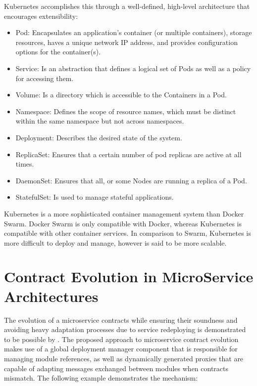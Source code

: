 Kubernetes accomplishes this through a well-defined, high-level architecture that encourages extensibility:

\begin{itemize}
    \item Pod: Encapsulates an application's container (or multiple containers),
    storage resources, haves a unique network IP address, and provides configuration options for the container(s).
    \item Service: Is an abstraction that defines a logical set of Pods as well as a policy for accessing them.
    \item Volume: Is a directory which is accessible to the
    Containers in a Pod.
    \item Namespace: Defines the scope of resource names, which must be distinct within the same namespace but not across namespaces.
    \item Deployment: Describes the desired state of the system.
    \item ReplicaSet: Ensures that a certain number of pod replicas are active at all times.
    \item DaemonSet: Ensures that all, or some Nodes are running a replica of a Pod.
    \item StatefulSet: Is used to manage stateful applications.
\end{itemize}

Kubernetes is a more sophisticated container management system than Docker Swarm.
Docker Swarm is only compatible with Docker, whereas Kubernetes is compatible with other container services.
In comparison to Swarm, Kubernetes is more difficult to deploy and manage, however is said to be more scalable.

\section{Contract Evolution in MicroService Architectures} %
\label{sec:contract_evolution_in_microservice_architectures}

The evolution of a microservice contracts while ensuring their soundness and
avoiding heavy adaptation processes due to service redeploying is demonstrated to be possible by \citeauthor{seco2020robust} \cite{seco2020robust}.
The proposed approach to microservice contract evolution \cite{seco2020robust} makes use of a global deployment manager component that is responsible for managing module references,
as well as dynamically generated proxies that are capable of adapting messages exchanged between modules when contracts mismatch.
The following example demonstrates the mechanism:

